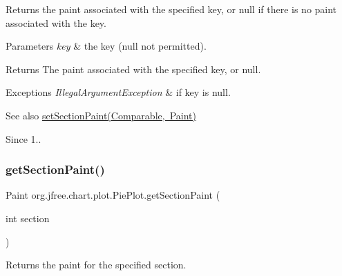 Returns the paint associated with the specified key, or {\ttfamily null} if there is no paint associated with the key.


\begin{DoxyParams}{Parameters}
{\em key} & the key ({\ttfamily null} not permitted).\\
\hline
\end{DoxyParams}
\begin{DoxyReturn}{Returns}
The paint associated with the specified key, or {\ttfamily null}.
\end{DoxyReturn}

\begin{DoxyExceptions}{Exceptions}
{\em Illegal\+Argument\+Exception} & if {\ttfamily key} is {\ttfamily null}.\\
\hline
\end{DoxyExceptions}
\begin{DoxySeeAlso}{See also}
\mbox{\hyperlink{classorg_1_1jfree_1_1chart_1_1plot_1_1_pie_plot_adee3362fbb406b556846f698e0ce628f}{set\+Section\+Paint(\+Comparable, Paint)}}
\end{DoxySeeAlso}
\begin{DoxySince}{Since}
1.. 
\end{DoxySince}
\mbox{\label{classorg_1_1jfree_1_1chart_1_1plot_1_1_pie_plot_a3bdefeeb9e51b707b1bec9a4f71775e3}} 
\subsubsection{\texorpdfstring{get\+Section\+Paint()}{getSectionPaint()}\hspace{0.1cm}{\footnotesize\ttfamily [3/3]}}
{\footnotesize\ttfamily Paint org.\+jfree.\+chart.\+plot.\+Pie\+Plot.\+get\+Section\+Paint (\begin{DoxyParamCaption}\item[{int}]{section }\end{DoxyParamCaption})}

Returns the paint for the specified section.


